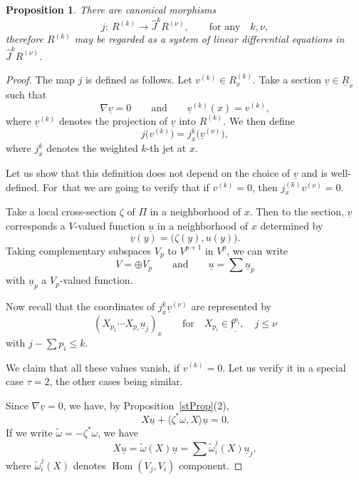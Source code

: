 \documentclass[pdftex]{sigma}%
\newcommand{\f}{\mathfrak f}
\newcommand{\wJ}{\widehat J}
\newcommand{\Hom}{\operatorname{Hom}}
\newtheorem{prop}[thm]{Proposition}
\numberwithin{equation}{section}
\begin{document}
\begin{prop}\label{rprop3}
	There are canonical morphisms
	\[
	j \colon\ R^{(k)} \to \wJ^{k} R^{(\nu)}, \qquad\text{for any}\quad k,\nu,
	\]
	therefore $ R^{(k)}$ may be regarded as a system of linear differential equations
	in $\wJ^{k} R^{(\nu)}$.
\end{prop}
\begin{proof}
	The map $j$ is defined as follows. Let $v^{(k)}\in R^{(k)}_x$. Take a section $\underline v\in \underline R_x$ such that
	\[
	\nabla \underline v = 0\qquad\text{and}\qquad \underline v^{(k)}(x) = v^{(k)},
	\]
	where $\underline{v}^{(k)}$ denotes the projection of $\underline{v}$ into $R^{(k)}$. We then define
	\[
	j\big(v^{(k)}\big) = j_x^{k}\big(\underline v^{(\nu)}\big),
	\]
	where $j_x^{k}$ denotes the weighted $k$-th jet at $x$.
	
	Let us show that this definition does not depend on the choice of $\underline v$ and is well-defined. For~that we are going to verify that if $v^{(k)}=0$, then $j_x^{(k)}v^{(\nu)}=0$.
	
	Take a local cross-section $\zeta$ of $\Pi$ in a neighborhood of $x$. Then to the section, $\underline v$ corresponds a $V$-valued function $\underline u$ in a neighborhood of $x$ determined by
	\[
	\underline v(y) = \big(\zeta(y), u(y)\big).
	\]
	Taking complementary subspaces $V_p$ to $V^{p+1}$ in $V^p$, we can write
	\[
	V = \oplus V_p\qquad\text{and}\qquad \underline u = \sum \underline u_p
	\]
	with $\underline u_p$ a $V_p$-valued function.

	Now recall that the coordinates of $j^k_x\underline v^{(\nu)}$ are represented by
\[
\left(X_{p_1}\cdots X_{p_\tau}\underline u_j\right)_x\qquad\text{for}\quad X_{p_i}\in \underline{\f^{p_i}},\quad j\le \nu
\]
with $j-\sum p_i\le k$.
	
We claim that all these values vanish, if $v^{(k)}=0$. Let us verify it in a special case $\tau=2$, the other cases being similar.
	
	Since $\nabla \underline v =0 $, we have, by Proposition~\ref{stProp}(2),
	\[
	X \underline u + \langle \zeta^*\omega, X\rangle \underline u = 0.
	\]
If we write $\tilde\omega = -\zeta^*\omega$, we have
	\[
	X\underline{u} = \tilde\omega(X)\underline u = \sum\tilde\omega^j_i(X)\underline u_j,
	\]
	where $\tilde\omega^j_i(X)$ denotes $\Hom(V_j,V_i)$ component.
	

\end{proof}
\end{document}
